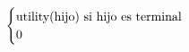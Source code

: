 \documentclass[preview]{standalone}
\begin{document}
\begin{align*}
\begin{cases}\text{utility(hijo) si hijo es terminal} \cr 0 \cr \end{cases}
\end{align*}
\end{document}
